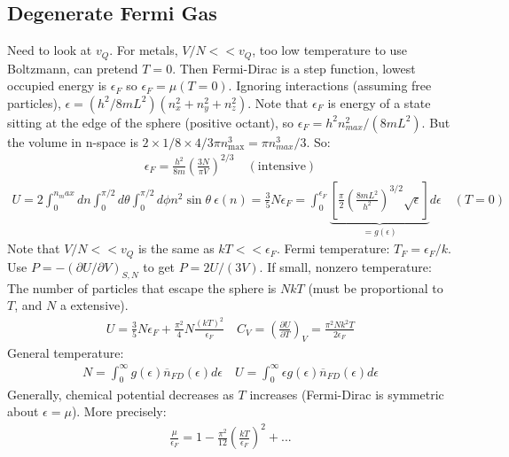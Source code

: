 \documentclass[12pt]{article}
\begin{document}
\subsection{Degenerate Fermi Gas}
Need to look at $v_Q$. For metals, $V/N<<v_Q$, too low temperature to use Boltzmann, can pretend $T=0$. Then Fermi-Dirac is a step function, lowest occupied energy is $\epsilon_F$ so $\epsilon_F=\mu(T=0)$. Ignoring interactions (assuming free particles), $\epsilon=(h^2/8mL^2)(n_x^2+n_y^2+n_z^2)$. Note that $\epsilon_F$ is energy of a state sitting at the edge of the sphere (positive octant), so $\epsilon_F=h^2n_{max}^2/(8mL^2)$. But the volume in n-space is $2\times 1/8\times 4/3\pi n_{\mathrm{max}}^3 = \pi n_{max}^3/3$. So:
\begin{align*}
\epsilon_F=\frac{h^2}{8m}\left(\frac{3N}{\pi V}\right)^{2/3}\quad \mathrm{(intensive)}
\end{align*}
\begin{align*}
U=2\int_0^{n_max}dn\int_0^{\pi/2}d\theta \int_0^{\pi/2} d\phi n^2\sin \theta \ \epsilon(n)=\frac{3}{5}N\epsilon_F=\int_0^{\epsilon_F}\underbrace{\left[\frac{\pi}{2}\left(\frac{8mL^2}{h^2}\right)^{3/2}\sqrt{\epsilon}\right]}_{=g(\epsilon)} d\epsilon \quad (T=0)
\end{align*}
Note that $V/N<<v_Q$ is the same as $kT<<\epsilon_F$. Fermi temperature: $T_F=\epsilon_F/k$. Use $P=-(\partial U/\partial V)_{S,N}$ to get $P=2U/(3V)$. If small, nonzero temperature: The number of particles that escape the sphere is $NkT$ (must be proportional to $T$, and $N$ a extensive). \begin{align*}
U=\frac{3}{5}N\epsilon_F+\frac{\pi^2}{4}N\frac{(kT)^2}{\epsilon_F}\quad C_V=\left(\frac{\partial U}{\partial T}\right)_V=\frac{\pi^2Nk^2T}{2\epsilon_F}
\end{align*}
General temperature:
\begin{align*}
N=\int_0^{\infty} g(\epsilon)\overline{n}_{FD}(\epsilon)d\epsilon \quad U=\int_0^{\infty} \epsilon g(\epsilon)\overline{n}_{FD}(\epsilon)d\epsilon
\end{align*}
Generally, chemical potential decreases as $T$ increases (Fermi-Dirac is symmetric about $\epsilon=\mu$). More precisely:
\begin{align*}
\frac{\mu}{\epsilon_F}=1-\frac{\pi^2}{12}\left(\frac{kT}{\epsilon_F}\right)^2+...
\end{align*}
\end{document}
